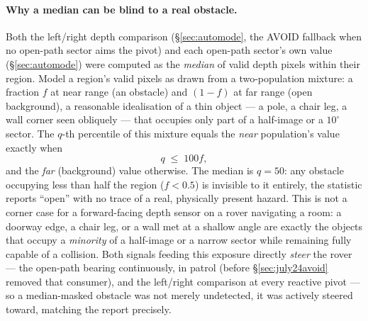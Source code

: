 \paragraph{Why a median can be blind to a real obstacle.} Both the
left/right depth comparison (\S\ref{sec:automode}, the AVOID fallback when
no open-path sector aims the pivot) and each open-path sector's own value
(\S\ref{sec:automode}) were computed as the \emph{median} of valid depth
pixels within their region. Model a region's valid pixels as drawn from a
two-population mixture: a fraction $f$ at near range (an obstacle) and
$(1-f)$ at far range (open background), a reasonable idealisation of a
thin object — a pole, a chair leg, a wall corner seen obliquely — that
occupies only part of a half-image or a $10^\circ$ sector. The $q$-th
percentile of this mixture equals the \emph{near} population's value
exactly when
\begin{equation}
q \;\le\; 100f,
\label{eq:percentilebias}
\end{equation}
and the \emph{far} (background) value otherwise. The median is $q=50$: any
obstacle occupying less than half the region ($f<0.5$) is invisible to it
entirely, the statistic reports ``open'' with no trace of a real, physically
present hazard. This is not a corner case for a forward-facing depth sensor
on a rover navigating a room: a doorway edge, a chair leg, or a wall met at
a shallow angle are exactly the objects that occupy a \emph{minority} of a
half-image or a narrow sector while remaining fully capable of a collision.
Both signals feeding this exposure directly \emph{steer} the rover — the
open-path bearing continuously, in patrol (before \S\ref{sec:july24avoid}
removed that consumer), and the left/right comparison at every reactive
pivot — so a median-masked obstacle was not merely undetected, it was
actively steered toward, matching the report precisely.

